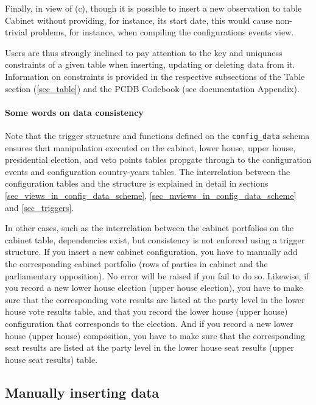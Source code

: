 Finally, in view of (c), though it is possible to insert a new observation to table Cabinet without providing, for instance, its start date, this would cause non-trivial problems, for instance, when compiling the configurations events view.

Users are thus strongly inclined to pay attention to the key and uniquness constraints of a given table when inserting, updating or deleting data from it. Information on constraints is provided in the respective subsections of the Table section (\ref{sec_table}) and the PCDB Codebook (see documentation Appendix).

\paragraph{Some words on data consistency}

Note that the trigger structure and functions defined on the \texttt{config\_data} schema ensures that manipulation executed on the cabinet, lower house, upper house, presidential election, and veto points tables propgate through to the configuration events and configuration country-years tables.
The interrelation between the configuration tables and the structure is explained in detail in sections \ref{sec_views_in_config_data_scheme}, \ref{sec_mviews_in_config_data_scheme} and \ref{sec_triggers}.

In other cases, such as the interrelation between the cabinet portfolios on the cabinet table, dependencies exist, but consistency is not enforced using a trigger structure. If you insert a new cabinet configuration, you have to manually add the corresponding cabinet portfolio (rows of parties in cabinet and the parliamentary opposition). No error will be raised if you fail to do so.
Likewise, if you record a new lower house election (upper house election), you have to make sure that the corresponding vote results are listed at the party level in the lower house vote results table, and that you record the lower house (upper house) configuration that corresponds to the election.
And if you record a new lower house (upper house) composition, you have to make sure that the corresponding seat results are listed at the party level in the lower house seat results (upper house seat results) table. 

\subsection{Manually inserting data}

